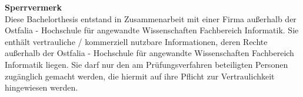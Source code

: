 

\newpage

\pagestyle{fancy}
\fancyhf{}
\fancyhead{} %
\renewcommand{\headrulewidth}{0.5pt}

\textbf{\Large Sperrvermerk}\vspace{10mm}\\
	Diese Bachelorthesis entstand in Zusammenarbeit mit einer Firma außerhalb der Ostfalia - Hochschule für angewandte Wissenschaften Fachbereich Informatik. Sie enthält vertrauliche / kommerziell nutzbare Informationen, deren Rechte außerhalb der Ostfalia - Hochschule für angewandte Wissenschaften Fachbereich Informatik liegen. Sie darf nur den am Prüfungsverfahren beteiligten Personen zugänglich gemacht werden, die hiermit auf ihre Pflicht zur Vertraulichkeit hingewiesen werden.
